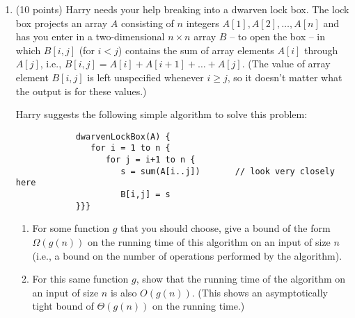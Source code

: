 \documentclass[12pt]{article}
\begin{document}
\begin{enumerate}
    \newpage

	\item (10 points) Harry needs your help breaking into a dwarven lock box. The lock box projects an array $A$ consisting of $n$ integers $A[1], A[2], \dots , A[n]$ and has you enter in a two-dimensional $n\times n$ array $B$ -- to open the box -- in which $B[i,j]$ (for $i<j$) contains the sum of array elements $A[i]$ through $A[j]$, i.e., $B[i,j] = A[i]+A[i+1]+\dots+A[j]$. (The value of array element $B[i,j]$ is left unspecified whenever $i\geq j$, so it doesn't matter what the output is for these values.)

	Harry suggests the following simple algorithm to solve this problem:
	\begin{small}
    	\begin{verbatim}
        	dwarvenLockBox(A) {
        	   for i = 1 to n {
        	      for j = i+1 to n {
        	         s = sum(A[i..j])       // look very closely here
        	         B[i,j] = s
        	}}}
    	\end{verbatim}
	\end{small}

	\begin{enumerate}
    	\item For some function $g$ that you should choose, give a bound of the form $\Omega(g(n))$ on the running time of this algorithm on an input of size $n$ (i.e., a bound on the number of operations performed by the algorithm).

    	\item For this same function $g$, show that the running time of the algorithm on an input of size $n$ is also $O(g(n))$. (This shows an asymptotically tight bound of $\Theta(g(n))$ on the running time.)
	\end{enumerate}

    \newpage


\end{enumerate}
\end{document}
